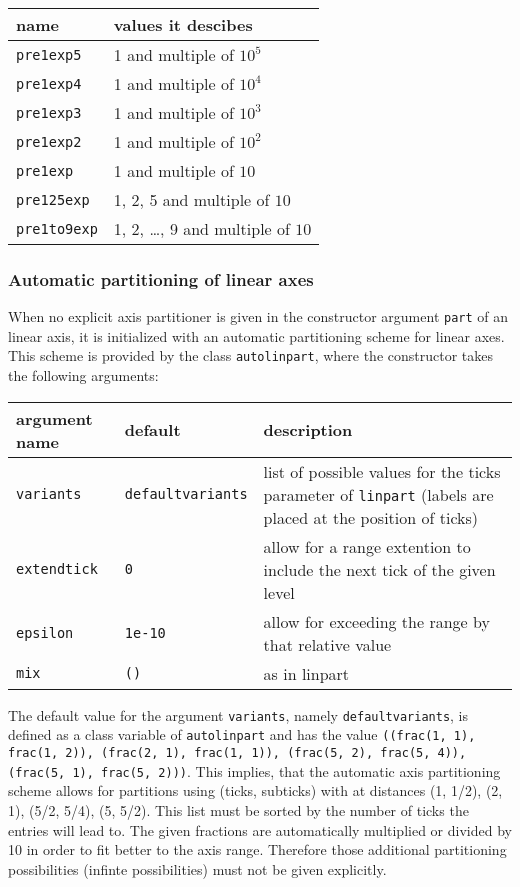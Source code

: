\begin{center}
\begin{tabular}{ll}
name&values it descibes\\
\hline
\texttt{pre1exp5}&1 and multiple of $10^5$\\
\texttt{pre1exp4}&1 and multiple of $10^4$\\
\texttt{pre1exp3}&1 and multiple of $10^3$\\
\texttt{pre1exp2}&1 and multiple of $10^2$\\
\texttt{pre1exp}&1 and multiple of $10$\\
\texttt{pre125exp}&1, 2, 5 and multiple of $10$\\
\texttt{pre1to9exp}&1, 2, \dots, 9 and multiple of $10$\\
\end{tabular}
\end{center}

\subsubsection{Automatic partitioning of linear axes}

When no explicit axis partitioner is given in the constructor argument
\verb|part| of an linear axis, it is initialized with an automatic
partitioning scheme for linear axes. This scheme is provided by the
class \verb|autolinpart|, where the constructor takes the following
arguments:

\medskip
\begin{tabularx}{\linewidth}{ll>{\raggedright\arraybackslash}X}
argument name&default&description\\
\hline
\texttt{variants}&\texttt{defaultvariants}&list of possible values for the ticks parameter of \texttt{linpart} (labels are placed at the position of ticks)\\
\texttt{extendtick}&\texttt{0}&allow for a range extention to include the next tick of the given level\\
\texttt{epsilon}&\texttt{1e-10}&allow for exceeding the range by that relative value\\
\texttt{mix}&\texttt{()}&as in linpart\\
\end{tabularx}
\medskip

The default value for the argument \verb|variants|, namely
\verb|defaultvariants|, is defined as a class variable of
\verb|autolinpart| and has the value \texttt{((frac(1, 1), frac(1,
2)), (frac(2, 1), frac(1, 1)), (frac(5, 2), frac(5, 4)), (frac(5, 1),
frac(5, 2)))}. This implies, that the automatic axis partitioning
scheme allows for partitions using (ticks, subticks) with at distances
(1, 1/2), (2, 1), (5/2, 5/4), (5, 5/2). This list must be sorted by
the number of ticks the entries will lead to. The given fractions are
automatically multiplied or divided by 10 in order to fit better to
the axis range. Therefore those additional partitioning possibilities
(infinte possibilities) must not be given explicitly.

